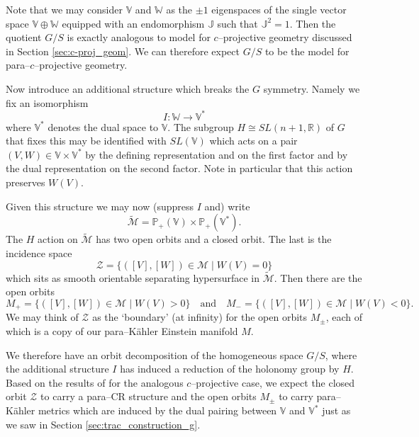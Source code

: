 Note that we may consider $\mathbb{V}$ and $\mathbb{W}$ as the $\pm 1$ eigenspaces of the single vector space $\mathbb{V}\oplus \mathbb{W}$ equipped with an endomorphism
$\mathbb{J}$ such that $\mathbb{J}^2=1$. Then the quotient $G/S$ is exactly analogous to model for $c$--projective geometry discussed in Section \ref{sec:c-proj_geom}. We can therefore expect $G/S$ to be the model for para--$c$--projective geometry.


Now introduce an additional structure which breaks the $G$
symmetry. 
Namely we fix an isomorphism
$$
I:\mathbb{W}\to \mathbb{V}^*
$$
where $\mathbb{V}^*$ denotes the dual space to $\mathbb{V}$. The subgroup $H\cong SL(n+1,\mathbb{R})$ of $G$
that fixes this may be identified with $SL(\mathbb{V})$ which acts on a pair
$(V,W)\in \mathbb{V}\times \mathbb{V}^*$ by the defining representation and on the first
factor and by the dual representation on the second factor. Note in particular that this action preserves $W(V)$.

Given this structure we may now (suppress $I$ and) write
$$
\widetilde{\mathcal{M}}= \mathbb{P}_+(\mathbb{V}) \times \mathbb{P}_+(\mathbb{V}^*).
$$
The ${H}$ action on $\widetilde{\mathcal{M}}$ has two open orbits and a closed orbit. The last
is the incidence space 
$$
\mathcal{Z}=\{ ([V],[W])\in \mathcal{M} \mid W(V)=0 \} 
$$
which sits as smooth orientable separating hypersurface in $\widetilde{\mathcal{M}}$. Then there are the open orbits
$$
M_+=\{ ([V],[W])\in \mathcal{M} \mid W(V)>0 \} \quad \mbox{and} \quad
M_-=\{ ([V],[W])\in \mathcal{M} \mid W(V)<0 \}.
$$
We may think of $\mathcal{Z}$ as the `boundary' (at infinity) for the open orbits $M_\pm$, each of which is a copy of our para--K\"ahler Einstein manifold $M$.

We therefore have an orbit decomposition of the homogeneous space $G/S$, where the additional structure $I$ has induced a reduction of the holonomy group by ${H}$. Based on the results of \cite{CGH-duke} for the analogous $c$--projective case, we expect the closed orbit $\mathcal{Z}$ to carry a para--CR structure and the open orbits $M_\pm$ to carry para--K\"ahler metrics which are induced by the dual pairing between $\mathbb{V}$ and $\mathbb{V}^*$ just as we saw in Section \ref{sec:trac_construction_g}.




